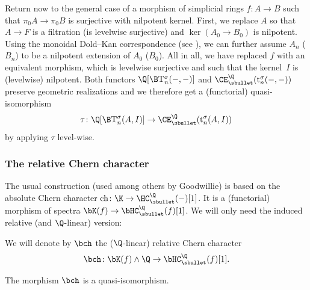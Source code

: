 Return now to the general case of a morphism of simplicial rings $f \colon A \to B$ such that $\pi_0 A \to \pi_0 B$ is surjective with nilpotent kernel. First, we replace $A$ so that $A \to F$ is a filtration (\ie is levelwise surjective) and $\ker(A_0 \to B_0)$ is nilpotent. Using the monoidal Dold--Kan correspondence (see \cite{schwedeshipley:monoidalDK}), we can further assume $A_n$ (\resp $B_n$) to be a nilpotent extension of $A_0$ (\resp $B_0$). All in all, we have replaced $f$ with an equivalent morphism, which is levelwise surjective and such that the kernel~$I$ is (levelwise) nilpotent.
Both functors $\Q[\B \mathrm{T}^\sigma_n(-,-)]$ and $\CE_\sbullet^\Q(\mathrm{t}^\sigma_n(-,-))$ preserve geometric realizations and we therefore get a (functorial) quasi-isomorphism
\[
\tau \colon \Q[\B \mathrm{T}^\sigma_n(A,I)] \to \CE_\sbullet^\Q(\mathrm{t}^\sigma_n(A,I))
\]
by applying $\tau$ level-wise.

\subsubsection{The relative Chern character}\label{par:chern}
The usual construction (used among others by Goodwillie) is based on the absolute Chern character $\mathrm{ch} \colon \K \to \HC^\Q_\sbullet(-)[1]$. It is a (functorial) morphism of spectra $\bK(f) \to \bHC_\sbullet^\Q(f)[1]$. We will only need the induced relative (and $\Q$-linear) version:

\begin{df}
We will denote by $\bch$ the ($\Q$-linear) relative Chern character
\[
\bch \colon \bK(f) \wedge \Q \to \bHC_\sbullet^\Q(f)[1].
\]
\end{df}

\begin{thm}\label{thm:goodwillie}
The morphism $\bch$ is a quasi-isomorphism.
\end{thm}

